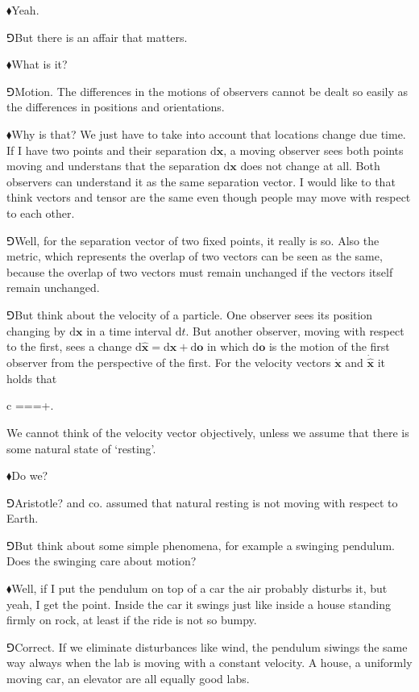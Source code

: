 \documentclass[11pt,oneside%
]{memoir}
\newenvironment{eqna}{\begin{IEEEeqnarray*}{c}}{\end{IEEEeqnarray*}\ignorespacesafterend}
\newcommand{\der}[2]{\frac{\dd#1}{\dd#2}}
\newcommand{\dd}{\mathrm{d}}
\renewcommand{\vec}[1]{\mathbf{#1}}
\newcommand{\dvec}[1]{\dot{\vec{#1}}}
\newcommand{\pvec}[1]{\primed{\vec{#1}}}
\newcommand{\primed}[1]{\hat{#1}}
\newcommand{\hea}{\(\blacklozenge\)\;}
\newcommand{\heb}{\(\Game\)\;}
\begin{document}
\hea Yeah.

\heb But there is an affair that matters.

\hea What is it?

\heb Motion. The differences in the motions of observers cannot be dealt so easily as the differences in positions and orientations.

\hea Why is that? We just have to take into account that locations change due time. If I have two points and their separation \(\dd\vec{x}\), a moving observer sees both points moving and understans that the separation \(\dd\vec{x}\) does not change at all. Both observers can understand it as the same separation vector. I would like to that think vectors and tensor are the same even though people may move with respect to each other.

\heb Well, for the separation vector of two fixed points, it really is so. Also the metric, which represents the overlap of two vectors can be seen as the same, because the overlap of two vectors must remain unchanged if the vectors itself remain unchanged.

\heb But think about the velocity of a particle. One observer sees its position changing by \(\dd\vec{x}\) in a time interval \(\dd t\). But another observer, moving with respect to the first, sees a change \(\dd\pvec{x}=\dd\vec{x}+\dd\vec{o}\) in which \(\dd\vec{o}\) is the motion of the first observer from the perspective of the first. For the velocity vectors \(\dvec{x}\) and \(\dot{\pvec{x}}\) it holds that
\begin{eqna}
    \dot{\pvec{x}}=\der{\pvec{x}}{t}=\der{\vec{x}+\dd\vec{o}}{t}=\dvec{x}+\dvec{o}.
\end{eqna}
We cannot think of the velocity vector objectively, unless we assume that there is some natural state of `resting'.

\hea Do we?

\heb Aristotle? and co. assumed that natural resting is not moving with respect to Earth.

\heb But think about some simple phenomena, for example a swinging pendulum. Does the swinging care about motion?

\hea Well, if I put the pendulum on top of a car the air probably disturbs it, but yeah, I get the point. Inside the car it swings just like inside a house standing firmly on rock, at least if the ride is not so bumpy.

\heb Correct. If we eliminate disturbances like wind, the pendulum siwings the same way always when the lab is moving with a constant velocity. A house, a uniformly moving car, an elevator are all equally good labs.
\end{document}
